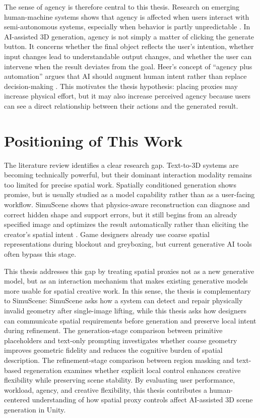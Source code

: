 \documentclass[11pt]{report}
\begin{document}
The sense of agency is therefore central to this thesis. Research on emerging human-machine systems shows that agency is affected when users interact with semi-autonomous systems, especially when behavior is partly unpredictable \cite{cornelio2022agency}. In AI-assisted 3D generation, agency is not simply a matter of clicking the generate button. It concerns whether the final object reflects the user's intention, whether input changes lead to understandable output changes, and whether the user can intervene when the result deviates from the goal. Heer's concept of ``agency plus automation'' argues that AI should augment human intent rather than replace decision-making \cite{heer2019agency}. This motivates the thesis hypothesis: placing proxies may increase physical effort, but it may also increase perceived agency because users can see a direct relationship between their actions and the generated result.

\section{Positioning of This Work}
\label{sec:rw-positioning}

The literature review identifies a clear research gap. Text-to-3D systems are becoming technically powerful, but their dominant interaction modality remains too limited for precise spatial work. Spatially conditioned generation shows promise, but is usually studied as a model capability rather than as a user-facing workflow. SimuScene shows that physics-aware reconstruction can diagnose and correct hidden shape and support errors, but it still begins from an already specified image and optimizes the result automatically rather than eliciting the creator's spatial intent \cite{lee2026simuscene}. Game designers already use coarse spatial representations during blockout and greyboxing, but current generative AI tools often bypass this stage.

This thesis addresses this gap by treating spatial proxies not as a new generative model, but as an interaction mechanism that makes existing generative models more usable for spatial creative work. In this sense, the thesis is complementary to SimuScene: SimuScene asks how a system can detect and repair physically invalid geometry after single-image lifting, while this thesis asks how designers can communicate spatial requirements before generation and preserve local intent during refinement. The generation-stage comparison between primitive placeholders and text-only prompting investigates whether coarse geometry improves geometric fidelity and reduces the cognitive burden of spatial description. The refinement-stage comparison between region masking and text-based regeneration examines whether explicit local control enhances creative flexibility while preserving scene stability. By evaluating user performance, workload, agency, and creative flexibility, this thesis contributes a human-centered understanding of how spatial proxy controls affect AI-assisted 3D scene generation in Unity.
\end{document}
